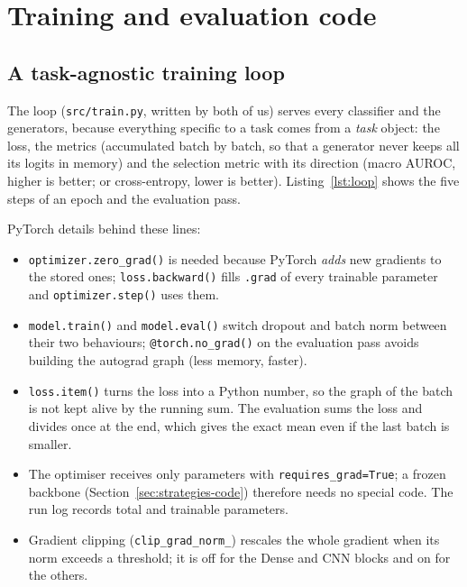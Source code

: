 \section{Training and evaluation code}\label{sec:training}

\subsection{A task-agnostic training loop}

The loop (\texttt{src/train.py}, written by both of us) serves every classifier and the generators,
because everything specific to a task comes from a \emph{task} object: the loss, the metrics
(accumulated batch by batch, so that a generator never keeps all its logits in memory) and the
selection metric with its direction (macro AUROC, higher is better; or cross-entropy, lower is
better). Listing~\ref{lst:loop} shows the five steps of an epoch and the evaluation pass.



PyTorch details behind these lines:
\begin{itemize}[leftmargin=1.2em,itemsep=1pt]
  \item \texttt{optimizer.zero\_grad()} is needed because PyTorch \emph{adds} new gradients to the
        stored ones; \texttt{loss.backward()} fills \texttt{.grad} of every trainable parameter and
        \texttt{optimizer.step()} uses them.
  \item \texttt{model.train()} and \texttt{model.eval()} switch dropout and batch norm between their two
        behaviours; \texttt{@torch.no\_grad()} on the evaluation pass avoids building the autograd graph
        (less memory, faster).
  \item \texttt{loss.item()} turns the loss into a Python number, so the graph of the batch is not kept
        alive by the running sum. The evaluation sums the loss and divides once at the end, which gives
        the exact mean even if the last batch is smaller.
  \item The optimiser receives only parameters with \texttt{requires\_grad=True}; a frozen backbone
        (Section~\ref{sec:strategies-code}) therefore needs no special code. The run log records total and
        trainable parameters.
  \item Gradient clipping (\texttt{clip\_grad\_norm\_}) rescales the whole gradient when its norm exceeds
        a threshold; it is off for the Dense and CNN blocks and on for the others.
\end{itemize}

